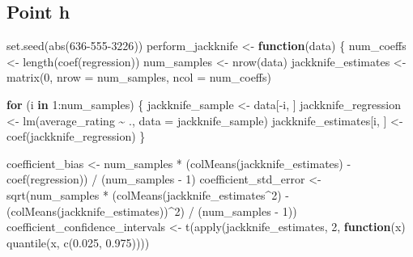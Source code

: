 \documentclass[
]{article}
\newenvironment{Shaded}{\begin{snugshade}}{\end{snugshade}}
\newcommand{\AttributeTok}[1]{\textcolor[rgb]{0.77,0.63,0.00}{#1}}
\newcommand{\ControlFlowTok}[1]{\textcolor[rgb]{0.13,0.29,0.53}{\textbf{#1}}}
\newcommand{\DecValTok}[1]{\textcolor[rgb]{0.00,0.00,0.81}{#1}}
\newcommand{\FloatTok}[1]{\textcolor[rgb]{0.00,0.00,0.81}{#1}}
\newcommand{\FunctionTok}[1]{\textcolor[rgb]{0.00,0.00,0.00}{#1}}
\newcommand{\NormalTok}[1]{#1}
\newcommand{\OtherTok}[1]{\textcolor[rgb]{0.56,0.35,0.01}{#1}}
\newcommand{\SpecialCharTok}[1]{\textcolor[rgb]{0.00,0.00,0.00}{#1}}
\begin{document}
\hypertarget{point-h-1}{%
\subsection{Point h}\label{point-h-1}}

\begin{Shaded}
\begin{Highlighting}[]
\FunctionTok{set.seed}\NormalTok{(}\FunctionTok{abs}\NormalTok{(}\DecValTok{636{-}555{-}3226}\NormalTok{))}
\NormalTok{perform\_jackknife }\OtherTok{\textless{}{-}} \ControlFlowTok{function}\NormalTok{(data) \{}
\NormalTok{  num\_coeffs }\OtherTok{\textless{}{-}} \FunctionTok{length}\NormalTok{(}\FunctionTok{coef}\NormalTok{(regression))}
\NormalTok{  num\_samples }\OtherTok{\textless{}{-}} \FunctionTok{nrow}\NormalTok{(data)}
\NormalTok{  jackknife\_estimates }\OtherTok{\textless{}{-}} \FunctionTok{matrix}\NormalTok{(}\DecValTok{0}\NormalTok{, }\AttributeTok{nrow =}\NormalTok{ num\_samples, }\AttributeTok{ncol =}\NormalTok{ num\_coeffs)}
  
  \ControlFlowTok{for}\NormalTok{ (i }\ControlFlowTok{in} \DecValTok{1}\SpecialCharTok{:}\NormalTok{num\_samples) \{}
\NormalTok{    jackknife\_sample }\OtherTok{\textless{}{-}}\NormalTok{ data[}\SpecialCharTok{{-}}\NormalTok{i, ] }
\NormalTok{    jackknife\_regression }\OtherTok{\textless{}{-}} \FunctionTok{lm}\NormalTok{(average\_rating }\SpecialCharTok{\textasciitilde{}}\NormalTok{ ., }\AttributeTok{data =}\NormalTok{ jackknife\_sample)}
\NormalTok{    jackknife\_estimates[i, ] }\OtherTok{\textless{}{-}} \FunctionTok{coef}\NormalTok{(jackknife\_regression)}
\NormalTok{  \}}
  
\NormalTok{  coefficient\_bias }\OtherTok{\textless{}{-}}\NormalTok{ num\_samples }\SpecialCharTok{*}\NormalTok{ (}\FunctionTok{colMeans}\NormalTok{(jackknife\_estimates) }\SpecialCharTok{{-}} \FunctionTok{coef}\NormalTok{(regression)) }\SpecialCharTok{/}\NormalTok{ (num\_samples }\SpecialCharTok{{-}} \DecValTok{1}\NormalTok{)}
\NormalTok{  coefficient\_std\_error }\OtherTok{\textless{}{-}} \FunctionTok{sqrt}\NormalTok{(num\_samples }\SpecialCharTok{*}\NormalTok{ (}\FunctionTok{colMeans}\NormalTok{(jackknife\_estimates}\SpecialCharTok{\^{}}\DecValTok{2}\NormalTok{) }\SpecialCharTok{{-}}\NormalTok{ (}\FunctionTok{colMeans}\NormalTok{(jackknife\_estimates))}\SpecialCharTok{\^{}}\DecValTok{2}\NormalTok{) }\SpecialCharTok{/}\NormalTok{ (num\_samples }\SpecialCharTok{{-}} \DecValTok{1}\NormalTok{))}
\NormalTok{  coefficient\_confidence\_intervals }\OtherTok{\textless{}{-}} \FunctionTok{t}\NormalTok{(}\FunctionTok{apply}\NormalTok{(jackknife\_estimates, }\DecValTok{2}\NormalTok{, }\ControlFlowTok{function}\NormalTok{(x) }\FunctionTok{quantile}\NormalTok{(x, }\FunctionTok{c}\NormalTok{(}\FloatTok{0.025}\NormalTok{, }\FloatTok{0.975}\NormalTok{))))}
  

\end{Highlighting}
\end{Shaded}
\end{document}
